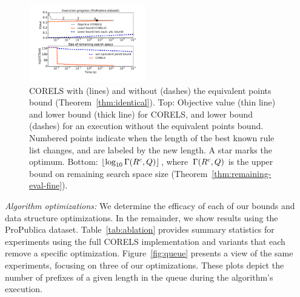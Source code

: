 \begin{figure}[t!]
\begin{center}
\includegraphics[trim={20mm, 25mm, 24mm, 0mm}, width=0.45\textwidth]{figs/compas_execution-remaining-space.pdf}
\end{center}
\caption{CORELS with (lines) and without
(dashes) the equivalent points bound (Theorem~\ref{thm:identical}).
%
%
Top: Objective value (thin line) and lower bound (thick line) for CORELS,
and lower bound (dashes) for an execution without the equivalent points bound.
%
Numbered points
indicate when the length of the best known rule list changes,
and are labeled by the new length.
%
A star marks the optimum.
%
%
Bottom: $\lfloor \log_{10} \Gamma({R^c}, Q) \rfloor$,
where~$\Gamma({R^c}, Q)$
is the upper bound on remaining search space size
(Theorem~\ref{thm:remaining-eval-fine}).
}
\label{fig:objective}
\end{figure}

\textit{Algorithm optimizations:}
We determine the efficacy of each of our bounds and data structure optimizations.
%
In the remainder, we show results using the ProPublica dataset.
%
Table~\ref{tab:ablation} provides summary statistics for experiments using
the full CORELS implementation and variants that each remove a specific optimization.
%
Figure~\ref{fig:queue} presents a view of the same experiments, focusing
on three of our optimizations. These plots depict the number of
prefixes of a given length in the queue during the algorithm's execution.

